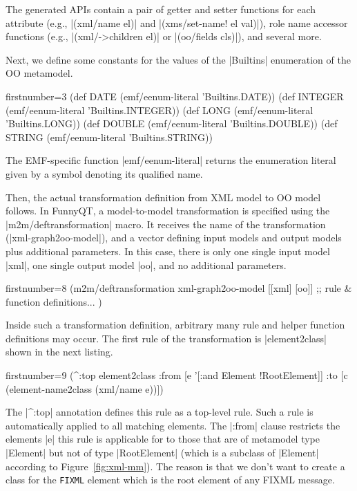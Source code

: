\documentclass[a4paper]{article}
\newcommand{\code}{\clojureinline}
\begin{document}
The generated APIs contain a pair of getter and setter functions for each
attribute (e.g., \code|(xml/name el)| and \code|(xms/set-name! el val)|), role
name accessor functions (e.g., \code|(xml/->children el)| or \code|(oo/fields
cls)|), and several more.

Next, we define some constants for the values of the \code|Builtins|
enumeration of the OO metamodel.

\begin{clojurecode*}{firstnumber=3}
(def DATE    (emf/eenum-literal 'Builtins.DATE))
(def INTEGER (emf/eenum-literal 'Builtins.INTEGER))
(def LONG    (emf/eenum-literal 'Builtins.LONG))
(def DOUBLE  (emf/eenum-literal 'Builtins.DOUBLE))
(def STRING  (emf/eenum-literal 'Builtins.STRING))
\end{clojurecode*}

The EMF-specific function \code|emf/eenum-literal| returns the enumeration
literal given by a symbol denoting its qualified name.

Then, the actual transformation definition from XML model to OO model follows.
In FunnyQT, a model-to-model transformation is specified using the
\code|m2m/deftransformation| macro.  It receives the name of the transformation
(\code|xml-graph2oo-model|), and a vector defining input models and output
models plus additional parameters.  In this case, there is only one single
input model \code|xml|, one single output model \code|oo|, and no additional
parameters.

\begin{clojurecode*}{firstnumber=8}
(m2m/deftransformation xml-graph2oo-model [[xml] [oo]]
  ;; rule & function definitions...
  )
\end{clojurecode*}

Inside such a transformation definition, arbitrary many rule and helper
function definitions may occur.  The first rule of the transformation is
\code|element2class| shown in the next listing.

\begin{clojurecode*}{firstnumber=9}
  (^:top element2class
   :from [e '[:and Element !RootElement]]
   :to   [c (element-name2class (xml/name e))])
\end{clojurecode*}

The \code|^:top| annotation defines this rule as a top-level rule.  Such a rule
is automatically applied to all matching elements.  The \code|:from| clause
restricts the elements \code|e| this rule is applicable for to those that are
of metamodel type \code|Element| but not of type \code|RootElement| (which is a
subclass of \code|Element| according to Figure~\ref{fig:xml-mm}).  The reason
is that we don't want to create a class for the \texttt{FIXML} element which is
the root element of any FIXML message.
\end{document}
